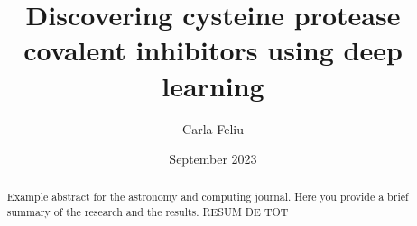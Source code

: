 \documentclass[final,times,twocolumn,article]{elsarticle}
\begin{document}
\pagestyle{fancy}
\fancyhead{}


\begin{frontmatter}



\title{Discovering cysteine protease covalent inhibitors using deep learning}


\author[first]{Carla Feliu}
\date{September 2023}
\begin{abstract}
Example abstract for the astronomy and computing journal. Here you provide a brief summary of the research and the results. RESUM DE TOT
\end{abstract}



\end{frontmatter}
\end{document}
